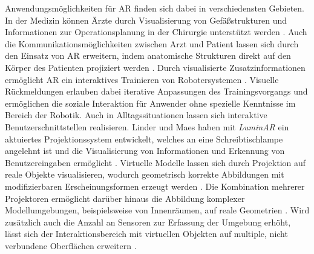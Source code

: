 Anwendungsmöglichkeiten für AR finden sich dabei in verschiedensten Gebieten. In der Medizin können Ärzte durch Visualisierung von Gefäßstrukturen und Informationen zur Operationsplanung in der Chirurgie unterstützt werden \cite{Nicolau2011}. Auch die Kommunikationsmöglichkeiten zwischen Arzt und Patient lassen sich durch den Einsatz von AR erweitern, indem anatomische Strukturen direkt auf den Körper des Patienten projiziert werden \cite{Bluteau2005}. Durch visualisierte Zusatzinformationen ermöglicht AR ein interaktives Trainieren von Robotersystemen \cite{DeTommaso2012}. Visuelle Rückmeldungen erlauben dabei iterative Anpassungen des Trainingsvorgangs und ermöglichen die soziale Interaktion für Anwender ohne spezielle Kenntnisse im Bereich der Robotik. Auch in Alltagssituationen lassen sich interaktive Benutzerschnittstellen realisieren. Linder und Maes haben mit \textit{LuminAR} ein aktuiertes Projektionssystem entwickelt, welches an eine Schreibtischlampe angelehnt ist und die Visualisierung von Informationen und Erkennung von Benutzereingaben ermöglicht \cite{Linder2010}. Virtuelle Modelle lassen sich durch Projektion auf reale Objekte visualisieren, wodurch geometrisch korrekte Abbildungen mit modifizierbaren Erscheinungsformen erzeugt werden \cite{Raskar1999}. Die Kombination mehrerer Projektoren ermöglicht darüber hinaus die Abbildung komplexer Modellumgebungen, beispielsweise von Innenräumen, auf reale Geometrien \cite{Low2001}. Wird zusätzlich auch die Anzahl an Sensoren zur Erfassung der Umgebung erhöht, lässt sich der Interaktionsbereich mit virtuellen Objekten auf multiple, nicht verbundene Oberflächen erweitern \cite{Wilson2010}.\\



